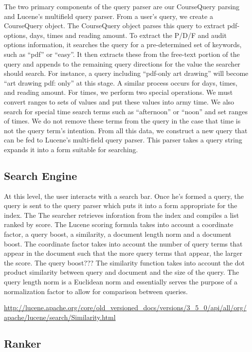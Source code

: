 \documentclass[12pt,letterpaper]{article}
\begin{document}
	The two primary components of the query parser are our CourseQuery parsing and Lucene's multifield query parser. From a user's query, we create a CourseQuery object. The CourseQuery object parses this query to extract pdf-options, days, times and reading amount. To extract the P/D/F and audit options information, it searches the query for a pre-determined set of keywords, such as ``pdf'' or ``easy''. It then extracts these from the free-text portion of the query and appends to the remaining query directions for the value the searcher should search. For instance, a query including ``pdf-only art drawing'' will become ``art drawing pdf: only'' at this stage. A similar process occurs for days, times, and reading amount. For times, we perform two special operations. We must convert ranges to sets of values and put these values into army time. We also search for special time search terms such as ``afternoon'' or ``noon'' and set ranges of times. We do not remove these terms from the query in the case that time is not the query term's intention. 
	From all this data, we construct a new query that can be fed to Lucene's multi-field query parser. This parser takes a query string expands it into a form suitable for searching. 
	
	\subsection{Search Engine}
		At this level, the user interacts with a search bar. Once he's formed a query, the query is sent to the query parser which puts it into a form appropriate for the index. The The searcher retrieves inforation from the index and compiles a list ranked by score. The Lucene scoring formula takes into account a coordinate factor, a query boost, a similarity, a document length norm and a document boost. 
		The coordinate factor takes into account the number of query terms that appear in the document such that the more query terms that appear, the larger the score. 
		The query boost???
		The similarity function takes into account the dot product similarity between query and document and the size of the query. The query length norm is a Euclidean norm and essentially serves the purpose of a normalization factor to allow for comparison between queries.
				
\url{http://lucene.apache.org/core/old_versioned_docs/versions/3_5_0/api/all/org/apache/lucene/search/Similarity.html}
		
\subsection{Ranker}
\end{document}
